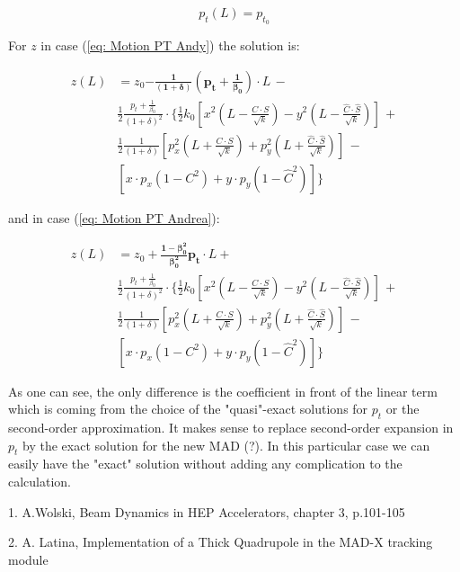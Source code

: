 \documentclass[12pt]{article}
\begin{document}
\begin{equation}
\label{eq: PT}
p_{t}(L) = p_{t_{0}}
\end{equation}

For $z$ in case (\ref{eq: Motion PT Andy}) the solution is:

\begin{align*}
z(L) &=  z_{0} \pmb {-\frac{1}{(1+\delta)}\left(p_{t} +\frac{1}{\beta_{0}}  \right)}  \cdot L \, -\\
&\frac{1}{2}\frac{p_{t} +\frac{1}{\beta_{0}}}{(1+\delta)^{2}} \cdot \Biggl\{  \frac{1}{2}k_{0}\left[ x^{2}\left( L - \frac{C \cdot S}{\sqrt{k}}\right) - y^{2}\left( L - \frac{\hat{C} \cdot \hat{S}}{\sqrt{k}}\right) \right] \, + \\
&\frac{1}{2}\frac{1}{(1+\delta)} \left[ p_{x}^{2}\left( L + \frac{C \cdot S}{\sqrt{k}}\right) + p_{y}^{2}\left( L + \frac{\hat{C} \cdot \hat{S}}{\sqrt{k}}\right) \right] \, -\\ 
& \left[ x\cdot p_{x}\left( 1 - C^{2} \right) + y \cdot p_{y}\left( 1-\hat{C}^{2}\right) \right] \Biggr\}
\end{align*}

and in case (\ref{eq: Motion PT Andrea}):

\begin{align*}
z(L) &=  z_{0}+ \pmb {\frac{1-\beta_{0}^2}{\beta_{0}^2}p_{t}} \cdot L + \, \\
&\frac{1}{2}\frac{p_{t} +\frac{1}{\beta_{0}}}{(1+\delta)^{2}} \cdot \Biggl\{  \frac{1}{2}k_{0}\left[ x^{2}\left( L - \frac{C \cdot S}{\sqrt{k}}\right) - y^{2}\left( L - \frac{\hat{C} \cdot \hat{S}}{\sqrt{k}}\right) \right] \, + \\
&\frac{1}{2}\frac{1}{(1+\delta)} \left[ p_{x}^{2}\left( L + \frac{C \cdot S}{\sqrt{k}}\right) + p_{y}^{2}\left( L + \frac{\hat{C} \cdot \hat{S}}{\sqrt{k}}\right) \right] \, -\\ 
& \left[ x\cdot p_{x}\left( 1 - C^{2} \right) + y \cdot p_{y}\left( 1-\hat{C}^{2}\right) \right] \Biggr\}
\end{align*}

As one can see, the only difference is the coefficient in front of the linear term which is coming from the choice of the "quasi"-exact solutions for $p_{t}$ or the second-order approximation. It makes sense to replace second-order expansion in $p_{t}$ by the exact solution for the new MAD (?). In this particular case we can easily have the "exact" solution without adding any complication to the calculation.


{\it
{}

1. A.Wolski, Beam Dynamics in HEP Accelerators, chapter 3, p.101-105 


2. A. Latina, Implementation of a Thick Quadrupole in the MAD-X tracking module
}
\end{document}
